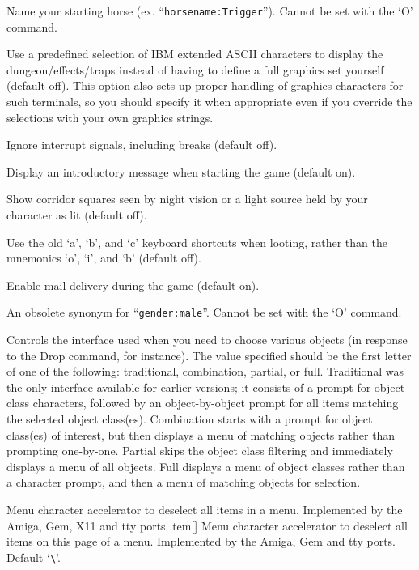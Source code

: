 Name your starting horse (ex. ``{\tt horsename:Trigger}'').
Cannot be set with the `O' command.
\item[\tb{IBMgraphics}]
Use a predefined selection of IBM extended ASCII characters to display the
dungeon/effects/traps instead of having to define a full graphics set
yourself (default off).
This option also sets up proper handling of graphics
characters for such terminals, so you should specify it when appropriate
even if you override the selections with your own graphics strings.
\item[\tb{ignintr}]
Ignore interrupt signals, including breaks (default off).
\item[\tb{legacy}]
Display an introductory message when starting the game (default on).
\item[\tb{lit\_corridor}]
Show corridor squares seen by night vision or a light source held by your
character as lit (default off).
\item[\tb{lootabc}]
Use the old `a', `b', and `c' keyboard shortcuts when
looting, rather than the mnemonics `o', `i', and `b' (default off).
\item[\tb{"mail    "}]
Enable mail delivery during the game (default on).
\item[\tb{"male    "}]
An obsolete synonym for ``{\tt gender:male}''.
Cannot be set with the `O' command.
\item[\tb{menustyle}]
Controls the interface used when you need to choose various objects (in
response to the Drop command, for instance).  The value specified should
be the first letter of one of the following:  traditional, combination,
partial, or full.  Traditional was the only interface available for
earlier versions; it consists of a prompt for object class characters,
followed by an object-by-object prompt for all items matching the selected
object class(es).  Combination starts with a prompt for object class(es)
of interest, but then displays a menu of matching objects rather than
prompting one-by-one.  Partial skips the object class filtering and
immediately displays a menu of all objects.  Full displays a menu of
object classes rather than a character prompt, and then a menu of matching
objects for selection.
\item[\tb{menu\_deselect\_all}]
Menu character accelerator to deselect all items in a menu.
Implemented by the Amiga, Gem, X11 and tty ports.
tem[]
Menu character accelerator to deselect all items on this page of a menu.
Implemented by the Amiga, Gem and tty ports.
Default `\verb+\+'.
